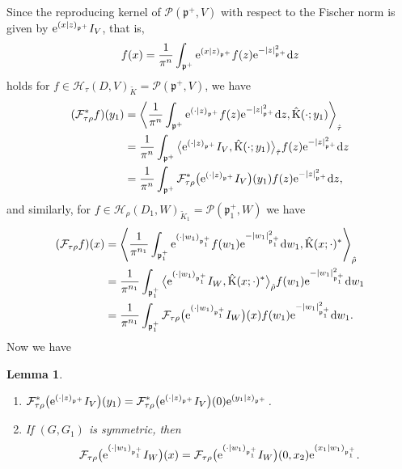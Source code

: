 \documentclass[pdftex]{sigma}
\numberwithin{equation}{section}
\newtheorem{Lemma}[Theorem]{Lemma}
\newcommand{\ds}{\displaystyle}
\newcommand{\fp}{\mathfrak{p}}
\newcommand{\cF}{\mathcal{F}}
\newcommand{\cH}{\mathcal{H}}
\newcommand{\cP}{\mathcal{P}}
\newcommand{\rK}{\mathrm{K}}
\begin{document}
Since the reproducing kernel of $\cP(\fp^+,V)$ with respect to the Fischer norm
is given by ${\rm e}^{(x|z)_{\fp^+}}I_V$, that is,
\begin{gather*} f(x)=\frac{1}{\pi^n}\int_{\fp^+}{\rm e}^{(x|z)_{\fp^+}}f(z){\rm e}^{-|z|_{\fp^+}^2}{\rm d}z \end{gather*}
holds for $f\in \cH_\tau(D,V)_{\tilde{K}}=\cP(\fp^+,V)$, we have
\begin{align*}
(\cF_{\tau\rho}^*f)(y_1)&=\left\langle \frac{1}{\pi^n}\int_{\fp^+}{\rm e}^{(\cdot|z)_{\fp^+}}f(z){\rm e}^{-|z|_{\fp^+}^2}{\rm d}z,
\hat{\rK}(\cdot;y_1)\right\rangle_{\hat{\tau}} \\
&=\frac{1}{\pi^n}\int_{\fp^+}\big\langle {\rm e}^{(\cdot|z)_{\fp^+}}I_V,\hat{\rK}(\cdot;y_1)\big\rangle_{\hat{\tau}}f(z){\rm e}^{-|z|_{\fp^+}^2}{\rm d}z \\
&=\frac{1}{\pi^n}\int_{\fp^+}\cF_{\tau\rho}^*\big({\rm e}^{(\cdot|z)_{\fp^+}}I_V\big)(y_1)f(z){\rm e}^{-|z|_{\fp^+}^2}{\rm d}z,
\end{align*}
and similarly, for $f\in \cH_\rho(D_1,W)_{\tilde{K}_1}=\cP(\fp^+_1,W)$ we have
\begin{align*}
(\cF_{\tau\rho}f)(x)&=\left\langle \frac{1}{\pi^{n_1}}\int_{\fp^+_1}{\rm e}^{(\cdot|w_1)_{\fp^+_1}}f(w_1){\rm e}^{-|w_1|_{\fp^+_1}^2}{\rm d}w_1,
\hat{\rK}(x;\cdot)^*\right\rangle_{\hat{\rho}} \\
&=\frac{1}{\pi^{n_1}}\int_{\fp^+_1}\big\langle {\rm e}^{(\cdot|w_1)_{\fp^+_1}}I_W,\hat{\rK}(x;\cdot)^*\big\rangle_{\hat{\rho}}
f(w_1){\rm e}^{-|w_1|_{\fp^+_1}^2}{\rm d}w_1 \\
&=\frac{1}{\pi^{n_1}}\int_{\fp^+_1}\cF_{\tau\rho}\big({\rm e}^{(\cdot|w_1)_{\fp^+_1}}I_W\big)(x)f(w_1){\rm e}^{-|w_1|_{\fp^+_1}^2}{\rm d}w_1.
\end{align*}
Now we have
\begin{Lemma}\quad
\begin{enumerate}\itemsep=0pt
\item[$(1)$] $\ds \cF_{\tau\rho}^*\big({\rm e}^{(\cdot|z)_{\fp^+}}I_V\big)(y_1)=\cF_{\tau\rho}^*\big({\rm e}^{(\cdot|z)_{\fp^+}}I_V\big)(0){\rm e}^{(y_1|z)_{\fp^+}}$.
\item[$(2)$] If $(G,G_1)$ is symmetric, then
\begin{gather*} \cF_{\tau\rho}\big({\rm e}^{(\cdot|w_1)_{\fp^+_1}}I_W\big)(x)=\cF_{\tau\rho}\big({\rm e}^{(\cdot|w_1)_{\fp^+_1}}I_W\big)(0,x_2){\rm e}^{(x_1|w_1)_{\fp^+_1}}. \end{gather*}
\end{enumerate}
\end{Lemma}
\end{document}
